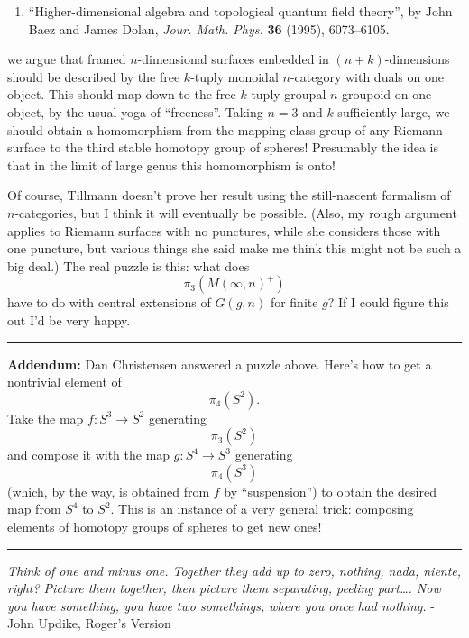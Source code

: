 \documentclass{article}
\def\tightlist{}
\begin{document}
\begin{enumerate}
\def\labelenumi{\arabic{enumi})}
\setcounter{enumi}{2}
\tightlist
\item
  ``Higher-dimensional algebra and topological quantum field theory'',
  by John Baez and James Dolan, \emph{Jour. Math. Phys.} \textbf{36}
  (1995), 6073--6105.
\end{enumerate}

we argue that framed \(n\)-dimensional surfaces embedded in
\((n+k)\)-dimensions should be described by the free \(k\)-tuply
monoidal \(n\)-category with duals on one object. This should map down
to the free \(k\)-tuply groupal \(n\)-groupoid on one object, by the
usual yoga of ``freeness''. Taking \(n = 3\) and \(k\) sufficiently
large, we should obtain a homomorphism from the mapping class group of
any Riemann surface to the third stable homotopy group of spheres!
Presumably the idea is that in the limit of large genus this
homomorphism is onto!

Of course, Tillmann doesn't prove her result using the still-nascent
formalism of \(n\)-categories, but I think it will eventually be
possible. (Also, my rough argument applies to Riemann surfaces with no
punctures, while she considers those with one puncture, but various
things she said make me think this might not be such a big deal.) The
real puzzle is this: what does \[\pi_3(M(\infty,n)^+)\] have to do with
central extensions of \(G(g,n)\) for finite \(g\)? If I could figure
this out I'd be very happy.

\begin{center}\rule{0.5\linewidth}{0.5pt}\end{center}

\textbf{Addendum:} Dan Christensen answered a puzzle above. Here's how
to get a nontrivial element of \[\pi_4(S^2).\] Take the map
\(f\colon S^3\to S^2\) generating \[\pi_3(S^2)\] and compose it with the
map \(g\colon S^4\to S^3\) generating \[\pi_4(S^3)\] (which, by the way,
is obtained from \(f\) by ``suspension'') to obtain the desired map from
\(S^4\) to \(S^2\). This is an instance of a very general trick:
composing elements of homotopy groups of spheres to get new ones!

\begin{center}\rule{0.5\linewidth}{0.5pt}\end{center}

\emph{Think of one and minus one. Together they add up to zero, nothing,
nada, niente, right? Picture them together, then picture them
separating, peeling part\ldots. Now you have something, you have two
somethings, where you once had nothing.} - John Updike, Roger's Version
\end{document}
